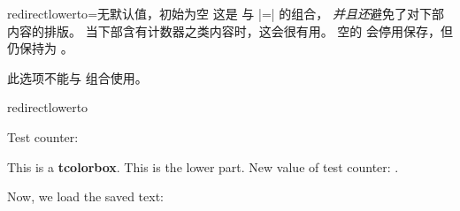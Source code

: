 \medskip

\begin{docTcbKey}[][doc new=2023-07-17]{redirectlowerto}{=}{无默认值，初始为空}
  这是  与 |=| 的组合，
  \emph{并且还}避免了对下部内容的排版。
  当下部含有计数器之类内容时，这会很有用。
  空的  会停用保存，但 
  仍保持为 。
  \begin{marker}
  此选项不能与  组合使用。
  \end{marker}
\begin{exdispExample}{redirectlowerto}

\setcounter{enumi}{1}
Test counter: \theenumi

\begin{tcolorbox}[redirectlowerto=\jobname_bspsave2.tex,colback=white]
This is a \textbf{tcolorbox}.
\tcblower
This is the lower part.
New value of test counter: \theenumi.
\end{tcolorbox}

Now, we load the saved text:\\

\end{exdispExample}
\end{docTcbKey}



